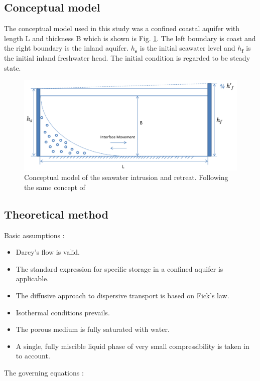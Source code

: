 \documentclass[review]{elsarticle}
\newcommand{\mbf}[1]{{\mathbf{#1}}}%
\begin{document}
\subsection{Conceptual model}

The conceptual model used in this study was a confined coastal aquifer with length L and thickness B which is shown is Fig. \ref{fig:seawater_intrusion}. The left boundary is coast and the right boundary is the inland aquifer. $h_\mbf{s}$ is the initial seawater level and $h_\mbf{f}$ is the initial inland freshwater head. The initial condition is regarded to be steady state. 
\begin{figure}
\centering
\includegraphics[width=1.0\textwidth]{figures/seawater_intrusion}
\caption{Conceptual model of the seawater intrusion and retreat. Following the same concept of \cite{lu2013timescales}}
\label{fig:seawater_intrusion}
\end{figure}

\subsection{Theoretical method}
Basic assumptions \cite{guo2002user}: 
\begin{itemize}
\item Darcy's flow is valid.  
\item The standard expression for specific storage in a confined aquifer is applicable.
\item The diffusive approach to dispersive transport is based on Fick's law.
\item Isothermal conditions prevails. 
\item The porous medium is fully saturated with water.
\item A single, fully miscible liquid phase of very small compressibility is taken in to account. 
\end{itemize}
The governing equations \cite{guo2002user}:
\end{document}
